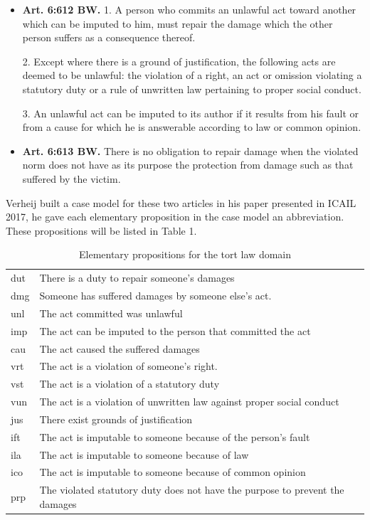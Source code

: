 \documentclass{IOS-Book-Article}
\begin{document}
\begin{itemize}
\item \textbf{Art. 6:612 BW.} 1. A person who commits an unlawful act toward another which can be imputed to him, must repair the damage which the other person suffers as a consequence thereof.

2. Except where there is a ground of justification, the following acts are deemed to be unlawful: the violation of a right, an act or omission violating a statutory duty or a rule of unwritten law pertaining to proper social conduct.

3. An unlawful act can be imputed to its author if it results from his fault or from a cause for which he is answerable according to law or common opinion.

\item \textbf{Art. 6:613 BW.} There is no obligation to repair damage when the violated norm does not have as its purpose the protection from damage such as that suffered by the victim.
\end{itemize}

Verheij built a case model for these two articles in his paper presented in ICAIL 2017\citep{Verheij2017Formalizing}, he gave each elementary proposition in the case model an abbreviation. These propositions will be listed in Table 1.

\footnotesize
\begin{table}[htb]
\caption{Elementary propositions for the tort law domain}
\centering
\begin{tabularx}{120mm}{>{\hsize=0.1\hsize}X>{\hsize=1.6\hsize}X}
\hline
dut	&	There is a duty to repair someone's damages\\
dmg	&	Someone has suffered damages by someone else's act.\\
unl	&	The act committed was unlawful\\
imp	&	The act can be imputed to the person that committed the act\\
cau	&	The act caused the suffered damages\\
vrt	&	The act is a violation of someone’s right.\\
vst	&	The act is a violation of a statutory duty\\
vun	&	The act is a violation of unwritten law against proper social conduct\\
jus	&	There exist grounds of justification\\
ift	&	The act is imputable to someone because of the person's fault\\
ila	&	The act is imputable to someone because of law\\
ico	&	The act is imputable to someone because of common opinion\\
prp	&	The violated statutory duty does not have the purpose to prevent the damages\\ \hline
\end{tabularx}
\end{table}
\normalsize
\end{document}
